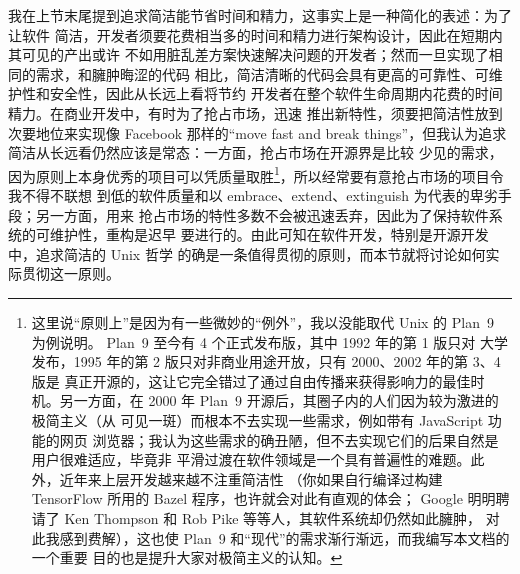 我在上节末尾提到追求简洁能节省时间和精力，这事实上是一种简化的表述：为了让软件
简洁，开发者须要花费相当多的时间和精力进行架构设计，因此在短期内其可见的产出或许
不如用脏乱差方案快速解决问题的开发者；然而一旦实现了相同的需求，和臃肿晦涩的代码
相比，简洁清晰的代码会具有更高的可靠性、可维护性和安全性，因此从长远上看将节约
开发者在整个软件生命周期内花费的时间精力。在商业开发中，有时为了抢占市场，迅速
推出新特性，须要把简洁性放到次要地位来实现像 Facebook 那样的“move fast and break
things”，但我认为追求简洁从长远看仍然应该是常态：一方面，抢占市场在开源界是比较
少见的需求，因为原则上本身优秀的项目可以凭质量取胜\footnote{\label{fn:plan9}%
这里说“原则上”是因为有一些微妙的“例外”，我以没能取代 Unix 的 Plan~9 为例说明。%
Plan~9 至今有 4 个正式发布版，其中 1992 年的第 1 版只对
大学发布，1995 年的第 2 版只对非商业用途开放，只有 2000、2002 年的第 3、4 版是
真正开源的，这让它完全错过了通过自由传播来获得影响力的最佳时机。另一方面，在
2000 年 Plan~9 开源后，其圈子内的人们因为较为激进的极简主义（从 \parencite%
{catv:hsoft} 可见一斑）而根本不去实现一些需求，例如带有 JavaScript 功能的网页
浏览器；我认为这些需求的确丑陋，但不去实现它们的后果自然是用户很难适应，毕竟非
平滑过渡在软件领域是一个具有普遍性的难题。此外，近年来上层开发越来越不注重简洁性
（你如果自行编译过构建 TensorFlow 所用的 Bazel 程序，也许就会对此有直观的体会；%
Google 明明聘请了 Ken Thompson 和 Rob Pike 等等人，其软件系统却仍然如此臃肿，
对此我感到费解），这也使 Plan~9 和“现代”的需求渐行渐远，而我编写本文档的一个重要
目的也是提升大家对极简主义的认知。}，所以经常要有意抢占市场的项目令我不得不联想
到低的软件质量和以 embrace、extend、extinguish 为代表的卑劣手段；另一方面，用来
抢占市场的特性多数不会被迅速丢弃，因此为了保持软件系统的可维护性，重构是迟早
要进行的。由此可知在软件开发，特别是开源开发中，追求简洁的 Unix 哲学
的确是一条值得贯彻的原则，而本节就将讨论如何实际贯彻这一原则。

